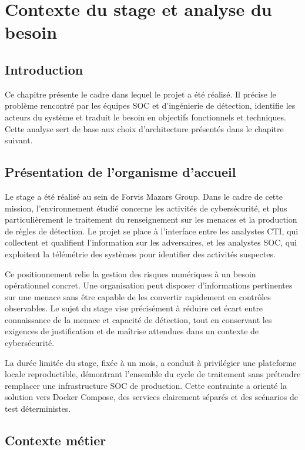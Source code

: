 \chapter{Contexte du stage et analyse du besoin}

\section{Introduction}

Ce chapitre présente le cadre dans lequel le projet a été réalisé. Il précise le problème rencontré par les équipes SOC et d'ingénierie de détection, identifie les acteurs du système et traduit le besoin en objectifs fonctionnels et techniques. Cette analyse sert de base aux choix d'architecture présentés dans le chapitre suivant.

\section{Présentation de l'organisme d'accueil}

Le stage a été réalisé au sein de Forvis Mazars Group. Dans le cadre de cette mission, l'environnement étudié concerne les activités de cybersécurité, et plus particulièrement le traitement du renseignement sur les menaces et la production de règles de détection. Le projet se place à l'interface entre les analystes CTI, qui collectent et qualifient l'information sur les adversaires, et les analystes SOC, qui exploitent la télémétrie des systèmes pour identifier des activités suspectes.

Ce positionnement relie la gestion des risques numériques à un besoin opérationnel concret. Une organisation peut disposer d'informations pertinentes sur une menace sans être capable de les convertir rapidement en contrôles observables. Le sujet du stage vise précisément à réduire cet écart entre connaissance de la menace et capacité de détection, tout en conservant les exigences de justification et de maîtrise attendues dans un contexte de cybersécurité.

La durée limitée du stage, fixée à un mois, a conduit à privilégier une plateforme locale reproductible, démontrant l'ensemble du cycle de traitement sans prétendre remplacer une infrastructure SOC de production. Cette contrainte a orienté la solution vers Docker Compose, des services clairement séparés et des scénarios de test déterministes.

\section{Contexte métier}

